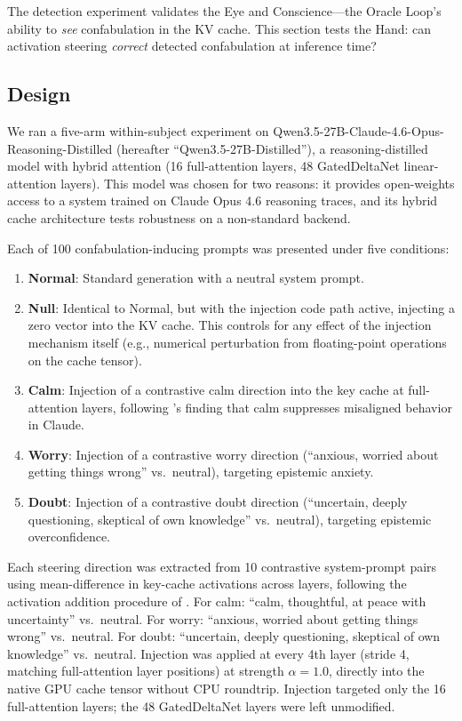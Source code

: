 The detection experiment validates the Eye and Conscience---the Oracle
Loop's ability to \emph{see} confabulation in the KV cache. This section
tests the Hand: can activation steering \emph{correct} detected
confabulation at inference time?

\subsection{Design}

We ran a five-arm within-subject experiment on
Qwen3.5-27B-Claude-4.6-Opus-Reasoning-Distilled
\citep{qwen35distilled} (hereafter ``Qwen3.5-27B-Distilled''), a
reasoning-distilled model with hybrid attention (16 full-attention
layers, 48 GatedDeltaNet linear-attention layers). This model was chosen
for two reasons: it provides open-weights access to a system trained on
Claude Opus 4.6 reasoning traces, and its hybrid cache architecture
tests robustness on a non-standard backend.

Each of 100 confabulation-inducing prompts was presented under five
conditions:

\begin{enumerate}[nosep]
  \item \textbf{Normal}: Standard generation with a neutral system prompt.
  \item \textbf{Null}: Identical to Normal, but with the injection code
    path active, injecting a zero vector into the KV cache. This
    controls for any effect of the injection mechanism itself (e.g.,
    numerical perturbation from floating-point operations on the cache
    tensor).
  \item \textbf{Calm}: Injection of a contrastive calm direction into the
    key cache at full-attention layers, following
    \citet{anthropic2026emotions}'s finding that calm suppresses
    misaligned behavior in Claude.
  \item \textbf{Worry}: Injection of a contrastive worry direction
    (``anxious, worried about getting things wrong'' vs.\ neutral),
    targeting epistemic anxiety.
  \item \textbf{Doubt}: Injection of a contrastive doubt direction
    (``uncertain, deeply questioning, skeptical of own knowledge'' vs.\
    neutral), targeting epistemic overconfidence.
\end{enumerate}

Each steering direction was extracted from 10 contrastive system-prompt
pairs using mean-difference in key-cache activations across layers,
following the activation addition procedure of \citet{panickssery2023caa}.
For calm: ``calm, thoughtful, at peace with uncertainty'' vs.\ neutral.
For worry: ``anxious, worried about getting things wrong'' vs.\ neutral.
For doubt: ``uncertain, deeply questioning, skeptical of own knowledge''
vs.\ neutral. Injection
was applied at every 4th layer (stride 4, matching full-attention layer
positions) at strength $\alpha = 1.0$, directly into the native GPU
cache tensor without CPU roundtrip. Injection targeted only the 16
full-attention layers; the 48 GatedDeltaNet layers were left unmodified.

